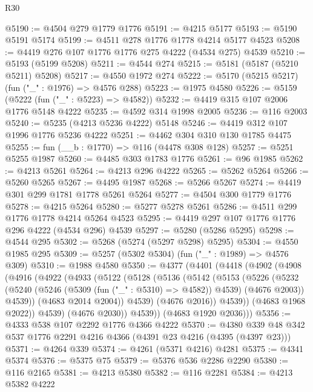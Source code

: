 \begin{lexlean}{R30}
\begin{coremodule}
@5190 := @4504 @279 @1779 @1776
@5191 := @4215 @5177
@5193 := @5190 @5191 @5174
@5199 := @4511 @278 @1776 @1778 @4214 @5177 @4523
@5208 := @4419 @276 @107 @1776 @1776 @275 @4222 (@4534 @275) @4539
@5210 := @5193 (@5199 @5208)
@5211 := @4544 @274
@5215 := @5181 (@5187 (@5210 @5211) @5208)
@5217 := @4550 @1972 @274
@5222 := @5170 (@5215 @5217) (fun ("_" : @1976) => @4576 @288)
@5223 := @1975 @4580
@5226 := @5159 (@5222 (fun ("_" : @5223) => @4582))
@5232 := @4419 @315 @107 @2006 @1776 @5148 @4222
@5235 := @4592 @314 @1998 @2005
@5236 := @116 @2003
@5240 := @5235 (@4213 @5236 @4222) @5148
@5246 := @4419 @312 @107 @1996 @1776 @5236 @4222
@5251 := @4462 @304 @310 @130 @1785 @4475
@5255 := fun (__b : @1770) => @116 (@4478 @308 @128)
@5257 := @5251 @5255 @1987
@5260 := @4485 @303 @1783 @1776
@5261 := @96 @1985
@5262 := @4213 @5261
@5264 := @4213 @296 @4222
@5265 := @5262 @5264
@5266 := @5260 @5265
@5267 := @4495 @1987
@5268 := @5266 @5267
@5274 := @4419 @301 @299 @1781 @1778 @5261 @5264
@5277 := @4504 @300 @1779 @1776
@5278 := @4215 @5264
@5280 := @5277 @5278 @5261
@5286 := @4511 @299 @1776 @1778 @4214 @5264 @4523
@5295 := @4419 @297 @107 @1776 @1776 @296 @4222 (@4534 @296) @4539
@5297 := @5280 (@5286 @5295)
@5298 := @4544 @295
@5302 := @5268 (@5274 (@5297 @5298) @5295)
@5304 := @4550 @1985 @295
@5309 := @5257 (@5302 @5304) (fun ("_" : @1989) => @4576 @309)
@5310 := @1988 @4580
@5350 := @4377
    (@4401
      (@4418
        (@4902
          (@4908
            (@4916
              (@4922
                (@4933
                  (@5122
                    (@5128
                      (@5136
                        (@5142
                          (@5153
                            (@5226
                              (@5232
                                (@5240
                                  (@5246 (@5309 (fun ("_" : @5310) => @4582)) @4539)
                                  (@4676 @2003))
                                @4539))
                            (@4683 @2014 @2004))
                          @4539)
                        (@4676 @2016))
                      @4539))
                  (@4683 @1968 @2022))
                @4539)
              (@4676 @2030))
            @4539))
        (@4683 @1920 @2036)))
@5356 := @4333 @538 @107 @2292 @1776 @4366 @4222
@5370 := @4380 @339 @48 @342 @537 @1776 @2291 @4216 @4366 (@4391 @23 @4216 (@4395 (@4397 @23)))
@5371 := @4264 @339
@5374 := @4261 (@5371 @4216) @4281
@5375 := @4341 @5374
@5376 := @5375 @75
@5379 := @5376 @536 @2286 @2290
@5380 := @116 @2165
@5381 := @4213 @5380
@5382 := @116 @2281
@5384 := @4213 @5382 @4222

\end{coremodule}
\end{lexlean}
